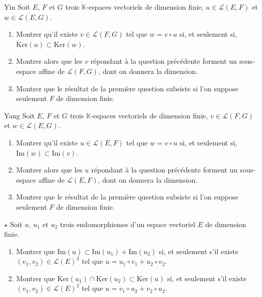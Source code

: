\documentclass[french,a4paper]{article}
\newcommand{\K}{\mathbb{K}}
\renewcommand{\ker}{\text{Ker}}
\theoremstyle{plain}
\theoremstyle{definition}
\theoremstyle{remark}
\begin{document}
\begin{ex}[Moulin.EV.48]{Yin}
	Soit $E$, $F$ et $G$ trois $\K$-espaces vectoriels de dimension finie, $u\in\mathcal{L}(E,F)$ et $w\in\mathcal{L}(E,G)$.
	\begin{enumerate}
		\item Montrer qu'il existe $v\in\mathcal{L}(F,G)$ tel que $w=v\circ u$ si, et seulement si, $\ker(u)\subset\ker(w)$.
		\item Montrer alors que les $v$ répondant à la question précédente forment un sous-espace affine de $\mathcal{L}(F,G)$, dont on donnera la dimension.
		\item Montrer que le résultat de la première question subsiste si l'on suppose seulement $F$ de dimension finie.
	\end{enumerate}
\end{ex}

\begin{ex}[Moulin.EV.49]{Yang}
	Soit $E$, $F$ et $G$ trois $\K$-espaces vectoriels de dimension finie, $v\in\mathcal{L}(F,G)$ et $w\in\mathcal{L}(E,G)$.
	\begin{enumerate}
		\item Montrer qu'il existe $u\in\mathcal{L}(E,F)$ tel que $w=v\circ u$ si, et seulement si, $\text{Im}(w)\subset\text{Im}(v)$.
		\item Montrer alors que les $u$ répondant à la question précédente forment un sous-espace affine de $\mathcal{L}(E,F)$, dont on donnera la dimension.
		\item Montrer que le résultat de la première question subsiste si l'on suppose seulement $F$ de dimension finie.
	\end{enumerate}
\end{ex}

\begin{ex}[Moulin.EV.50]{$\star$}
	Soit $u$, $u_1$ et $u_2$ trois endomorphismes d'un espace vectoriel $E$ de dimension finie.
	\begin{enumerate}
		\item Montrer que $\text{Im}(u)\subset\text{Im}(u_1)+\text{Im}(u_2)$ si, et seulement s'il existe $(v_1,v_2)\in\mathcal{L}(E)^2$ tel que $u=u_1\circ v_1+u_2\circ v_2$.
		\item Montrer que $\ker(u_1)\cap\ker(u_2)\subset\ker(u)$ si, et seulement s'il existe $(v_1,v_2)\in\mathcal{L}(E)^2$ tel que $u=v_1\circ u_2+v_2\circ u_2$.
	\end{enumerate}
\end{ex}
\end{document}
